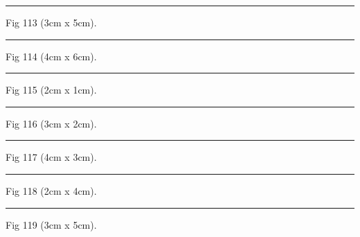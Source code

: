 \documentclass[a4paper,11pt]{article}
\begin{document}
\begin{swarmwrap}%
  \begin{minipage}[t]{3cm}
    \centering
    \rule{\linewidth}{5cm}
    {\footnotesize Fig 113 (3cm x 5cm).}
  \end{minipage}%
\end{swarmwrap}%
\swarmwrapnext
\lipsum[113]%

\begin{swarmwrap}%
  \begin{minipage}[t]{4cm}
    \centering
    \rule{\linewidth}{6cm}
    {\footnotesize Fig 114 (4cm x 6cm).}
  \end{minipage}%
\end{swarmwrap}%
\swarmwrapnext
\lipsum[114]%

\begin{swarmwrap}%
  \begin{minipage}[t]{2cm}
    \centering
    \rule{\linewidth}{1cm}
    {\footnotesize Fig 115 (2cm x 1cm).}
  \end{minipage}%
\end{swarmwrap}%
\swarmwrapnext
\lipsum[115]%

\begin{swarmwrap}%
  \begin{minipage}[t]{3cm}
    \centering
    \rule{\linewidth}{2cm}
    {\footnotesize Fig 116 (3cm x 2cm).}
  \end{minipage}%
\end{swarmwrap}%
\swarmwrapnext
\lipsum[116]%

\begin{swarmwrap}%
  \begin{minipage}[t]{4cm}
    \centering
    \rule{\linewidth}{3cm}
    {\footnotesize Fig 117 (4cm x 3cm).}
  \end{minipage}%
\end{swarmwrap}%
\swarmwrapnext
\lipsum[117]%

\begin{swarmwrap}%
  \begin{minipage}[t]{2cm}
    \centering
    \rule{\linewidth}{4cm}
    {\footnotesize Fig 118 (2cm x 4cm).}
  \end{minipage}%
\end{swarmwrap}%
\swarmwrapnext
\lipsum[118]%

\begin{swarmwrap}%
  \begin{minipage}[t]{3cm}
    \centering
    \rule{\linewidth}{5cm}
    {\footnotesize Fig 119 (3cm x 5cm).}
  \end{minipage}%
\end{swarmwrap}%
\swarmwrapnext
\lipsum[119]%
\end{document}
